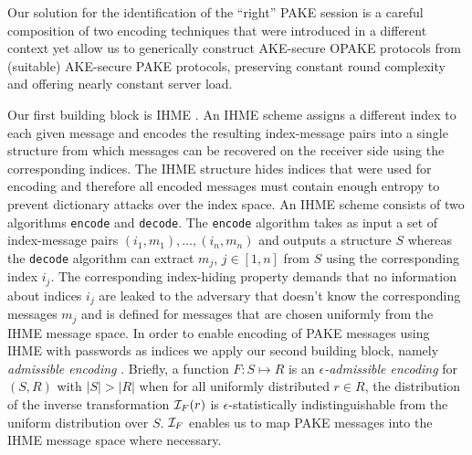Our solution for the identification of the ``right'' \ac{PAKE} session is a careful composition of two encoding techniques that were introduced in a different context yet allow us to generically construct \ac{AKE}-secure \ac{OPAKE} protocols from (suitable) \ac{AKE}-secure \ac{PAKE} protocols, preserving constant round complexity and offering nearly constant server load.

Our first building block is \ac{IHME} \cite{Manulis2010,Manulis2011}.
An \ac{IHME} scheme assigns a different index to each given message and encodes the resulting index-message pairs into a single structure from which messages can be recovered on the receiver side using the corresponding indices.
The \ac{IHME} structure hides indices that were used for encoding and therefore all encoded messages must contain enough entropy to prevent dictionary attacks over the index space.
An \ac{IHME} scheme consists of two algorithms \texttt{encode} and \texttt{decode}.
The \texttt{encode} algorithm takes as input a set of index-message pairs $(i_1, m_1),\ldots,(i_n, m_n)$ and outputs a structure $S$ whereas the \texttt{decode} algorithm can extract $m_j$, $j\in[1,n]$ from $S$ using the corresponding index $i_j$.
The corresponding index-hiding property demands that no information about indices $i_j$ are leaked to the adversary that doesn't know the corresponding messages $m_j$ and is defined for messages that are chosen uniformly from the \ac{IHME} message space.
In order to enable encoding of \ac{PAKE} messages using \ac{IHME} with passwords as indices we apply our second building block, namely \emph{admissible encoding} \cite{BonehF01,BrierCIMRT10,pseudorandomSignatures}.
Briefly, a function $F:S\mapsto R$ is an \emph{$\epsilon$-admissible encoding} for $(S,R)$ with $|S|>|R|$ when for all uniformly distributed $r\in R$, the distribution of the inverse transformation $\mathcal{I}_F(r)$ is $\epsilon$-statistically indistinguishable from the uniform distribution over $S$.
$\mathcal{I}_F$ enables us to map \ac{PAKE} messages into the \ac{IHME} message space where necessary.

